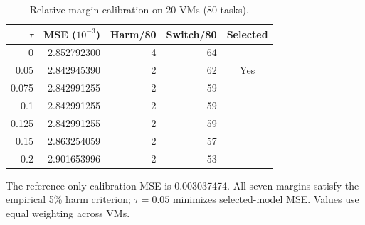 \begin{table}[pos=!htbp]
\centering\small
\caption{Relative-margin calibration on 20 VMs (80 tasks).}\label{tab:s-cal}
\begin{tabular}{rrrrc}
\toprule
$\tau$ & MSE ($10^{-3}$) & Harm/80 & Switch/80 & Selected\\\midrule
0 & 2.852792300 & 4 & 64 & \\
0.05 & 2.842945390 & 2 & 62 & Yes\\
0.075 & 2.842991255 & 2 & 59 & \\
0.1 & 2.842991255 & 2 & 59 & \\
0.125 & 2.842991255 & 2 & 59 & \\
0.15 & 2.863254059 & 2 & 57 & \\
0.2 & 2.901653996 & 2 & 53 & \\
\bottomrule
\end{tabular}
\par\vspace{3pt}\begin{minipage}{\linewidth}\footnotesize The reference-only calibration MSE is 0.003037474. All seven margins satisfy the empirical 5\% harm criterion; $\tau=0.05$ minimizes selected-model MSE. Values use equal weighting across VMs.\end{minipage}
\end{table}
